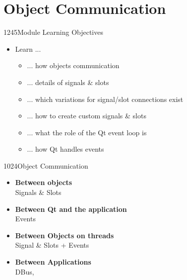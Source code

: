 %
%
%
%

\section{Object Communication}

\begin{slide}{1245}{Module Learning Objectives}
\begin{itemize}
\item Learn ...
  \begin{itemize}
  \item ... how objects communication
  \item ... details of signals \& slots
  \item ... which variations for signal/slot connections exist
  \item ... how to create custom signals \& slots
  \item ... what the role of the Qt event loop is
  \item ... how Qt handles events
  \end{itemize}
\end{itemize}

\end{slide}


\begin{slide}{1024}{Object Communication}
\begin{itemize}
  \item \textbf{Between objects}\\
    Signals \& Slots\medskip
  \item \textbf{Between Qt and the application}\\
    Events\medskip
  \item \textbf{Between Objects on threads}\\
    Signal \& Slots + Events\medskip
  \item \textbf{Between Applications}\\
    DBus, 
\end{itemize}

\end{slide}






